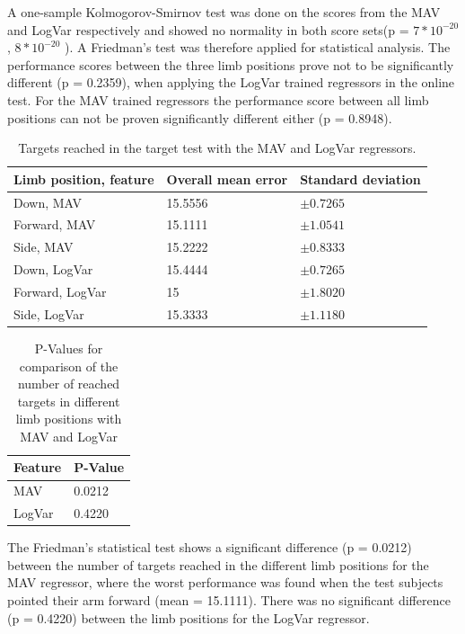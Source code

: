 	A one-sample Kolmogorov-Smirnov test was done on the scores from the MAV and LogVar respectively and showed no normality in both score sets(p = $7 * 10^{-20}$, $8 * 10^{-20}$ ). A Friedman's test was therefore applied for statistical analysis. The performance scores between the three limb positions prove not to be significantly different (p = 0.2359), when applying the LogVar trained regressors in the online test. For the MAV trained regressors the performance score between all limb positions can not be proven significantly different either (p = 0.8948). 
	
	\begin{table}[!thpb]
		\begin{center}
			\begin{tabular}{l l l}
				\hline
				\textbf{Limb position, feature} & \textbf{Overall mean error} & \textbf{Standard deviation}\\
				\hline
				Down, MAV & 15.5556 & $\pm 0.7265$ \\
				Forward, MAV & 15.1111 & $\pm 1.0541$ \\
				Side, MAV & 15.2222 & $\pm 0.8333$ \\
				Down, LogVar & 15.4444 & $\pm 0.7265$ \\
				Forward, LogVar & 15 & $\pm 1.8020$ \\
				Side, LogVar & 15.3333 & $\pm 1.1180$ \\
				\hline
			\end{tabular}
			\caption{Targets reached in the target test with the MAV and LogVar regressors.}
		\end{center}
	\end{table}
	
	\begin{table}[!thpb]
		\begin{center}
			\begin{tabular}{l l}
				\hline
				\textbf{Feature} & \textbf{P-Value}\\
				\hline
				MAV & 0.0212 \\
				LogVar & 0.4220 \\
				\hline
			\end{tabular}
			\caption{P-Values for comparison of the number of reached targets in different limb positions with MAV and LogVar}
		\end{center}
	\end{table}
	
	The Friedman's statistical test shows a significant difference (p = 0.0212) between the number of targets reached in the different limb positions for the MAV regressor, where the worst performance was found when the test subjects pointed their arm forward (mean = 15.1111). There was no significant difference (p = 0.4220) between the limb positions for the LogVar regressor.
	
